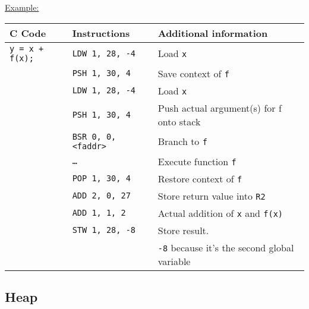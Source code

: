 \par{
	\noindent
    \underline{Example:}
    \par{
        \noindent
        \begin{tabular}{lll}
            \hline
            C Code              	&   Instructions                &    Additional information                             				\\
            \hline
            \hline
            \rowcolor{blue!25}                
            \texttt{y = x + f(x);}	&   \texttt{LDW 1, 28, -4}     	&   Load \texttt{x}														\\
            \rowcolor{blue!25}
            						&   \texttt{PSH 1, 30, 4}     	&   Save context of \texttt{f}			             					\\
            \rowcolor{blue!25}
									&	\texttt{LDW 1, 28, -4}		&	Load \texttt{x}														\\
            \rowcolor{blue!25}
            						&   \texttt{PSH 1, 30, 4}     	&   Push actual argument(s) for f onto stack		             		\\
            \rowcolor{blue!25}
									&	\texttt{BSR 0, 0, <faddr>}	&	Branch to \texttt{f}												\\
            \rowcolor{blue!25}
            						&   \texttt{\ldots}     		&  	Execute function \texttt{f}						             		\\
            \rowcolor{blue!25}
            						&   \texttt{POP 1, 30, 4}     	&   Restore context of \texttt{f}					             		\\
            \rowcolor{blue!25}
									&	\texttt{ADD 2, 0, 27}		&	Store return value into \texttt{R2}									\\
            \rowcolor{blue!25}
            						&   \texttt{ADD 1, 1, 2}     	&   Actual addition of \texttt{x} and \texttt{f(x)}        				\\
            \rowcolor{blue!25}
									&	\texttt{STW 1, 28, -8}		&	Store result.														\\
			\rowcolor{blue!25}
									&								&	\texttt{-8} because it's the second global variable					\\
            \hline
        \end{tabular}
    }    
}

\subsection*{Heap}

